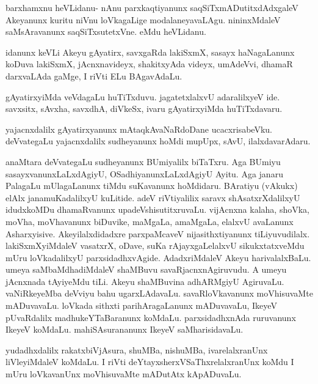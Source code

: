 \documentclass{article}
\begin{document}
\begin{mng}%
barxhamxnu heVLidanu- nAnu parxkaqtiyanunx saqSiTxmADutitxdAdxgaleV 
Akeyanunx kuritu niVnu loVkagaLige modalaneyavaLAgu. nininxMdaleV 
saMsAravanunx saqSiTxsutetxVne. eMdu heVLidanu.
\end{mng}

\begin{mng}%
idanunx keVLi Akeyu gAyatirx, savxgaRda lakiSxmX, sasayx haNagaLanunx 
koDuva lakiSxmX, jAcnxnavideyx, shakitxyAda videyx, umAdeVvi, dhamaR 
darxvaLAda gaMge, I riVti ELu BAgavAdaLu.
\end{mng}

\begin{mng}%
gAyatirxyiMda veVdagaLu huTiTxduvu. jagatetxlalxvU adaralilxyeV ide. 
savxsitx, sAvxha, savxdhA, diVkeSx, ivaru gAyatirxyiMda huTiTxdavaru.
\end{mng}

\begin{mng}%
yajacnxdalilx gAyatirxyanunx mAtaqkAvaNaRdoDane ucacxrisabeVku. 
deVvategaLu yajacnxdalilx sudheyanunx hoMdi mupUpx, sAvU, 
ilalxdavarAdaru.
\end{mng}

\begin{mng}%
anaMtara deVvategaLu sudheyanunx BUmiyalilx biTaTxru. Aga BUmiyu 
sasayxvanunxLaLxdAgiyU, OSadhiyanunxLaLxdAgiyU Ayitu. Aga janaru 
PalagaLu mUlagaLanunx tiMdu suKavanunx hoMdidaru. BAratiyu (vAkukx) 
elAlx janamuKadalilxyU kuLitide. adeV riVtiyalilix saravx 
shAsatxrXdalilxyU idudxkoMDu dhamaRvanunx upadeVshisutitxruvaLu. 
vijAcnxna kalaha, shoVka, moVha, moVhavanunx biDuvike, maMgaLa, 
amaMgaLa, elalxvU avaLanunx Asharxyisive. Akeyilalxdidadxre 
parxpaMcaveV nijasithxtiyanunx tiLiyuvudilalx. lakiSxmXyiMdaleV 
vasatxrX, oDave, suKa rAjayxgaLelalxvU sikukxtatxveMdu mUru 
loVkadalilxyU parxsidadhxvAgide. AdadxriMdaleV Akeyu harivalalxBaLu. 
umeya saMbaMdhadiMdaleV shaMBuvu savaRjacnxnAgiruvudu. A umeyu 
jAcnxnada tAyiyeMdu tiLi. Akeyu shaMBuvina adhARMgiyU AgiruvaLu. 
vaNiRkeyeMba deVviyu bahu ugarxLAdavaLu. savaRloVkavanunx moVhisuvaMte 
mADuvavaLu. loVkada sithxti parihAragaLanunx mADuvavaLu, IkeyeV 
pUvaRdalilx madhukeYTaBaranunx koMdaLu. parxsidadhxnAda ruruvanunx 
IkeyeV koMdaLu. mahiSAsurananunx IkeyeV saMharisidavaLu.
\end{mng}

\begin{mng}%
yudadhxdalilx rakatxbiVjAsura, shuMBa, nishuMBa, ivarelalxranUnx 
liVleyiMdaleV koMdaLu. I riVti deYtayxsherxVSaThxrelalxranUnx koMdu I 
mUru loVkavanUnx moVhisuvaMte mADutAtx kApADuvaLu.
\end{mng}
\end{document}
